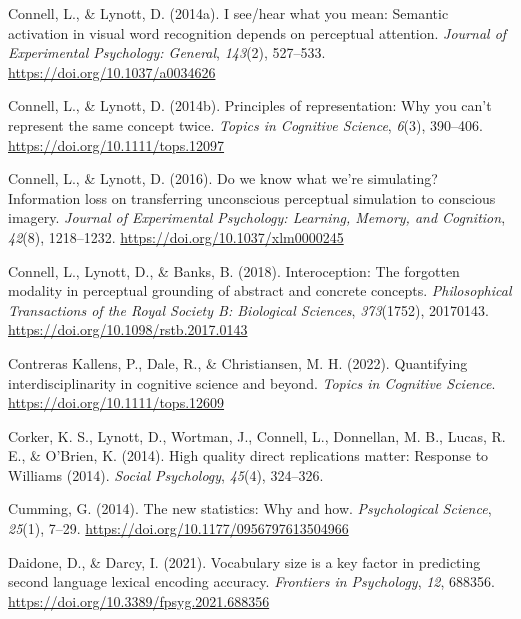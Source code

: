 \documentclass[
  12pt,
  man,floatsintext]{apa7}
\newlength{\cslhangindent}
\newlength{\cslentryspacingunit} %
\newenvironment{CSLReferences}[2] %
 {%
  \setlength{\parindent}{0pt}
  \ifodd #1
  \let\oldpar\par
  \def\par{\hangindent=\cslhangindent\oldpar}
  \fi
  \setlength{\parskip}{#2\cslentryspacingunit}
 }%
 {}
\begin{document}
\begin{CSLReferences}{1}{0}
\leavevmode{}%
Connell, L., \& Lynott, D. (2014a). I see/hear what you mean: {Semantic} activation in visual word recognition depends on perceptual attention. \emph{Journal of Experimental Psychology: General}, \emph{143}(2), 527--533. \url{https://doi.org/10.1037/a0034626}

\leavevmode{}%
Connell, L., \& Lynott, D. (2014b). Principles of representation: Why you can't represent the same concept twice. \emph{Topics in Cognitive Science}, \emph{6}(3), 390--406. \url{https://doi.org/10.1111/tops.12097}

\leavevmode{}%
Connell, L., \& Lynott, D. (2016). Do we know what we're simulating? {Information} loss on transferring unconscious perceptual simulation to conscious imagery. \emph{Journal of Experimental Psychology: Learning, Memory, and Cognition}, \emph{42}(8), 1218--1232. \url{https://doi.org/10.1037/xlm0000245}

\leavevmode{}%
Connell, L., Lynott, D., \& Banks, B. (2018). Interoception: The forgotten modality in perceptual grounding of abstract and concrete concepts. \emph{Philosophical Transactions of the Royal Society B: Biological Sciences}, \emph{373}(1752), 20170143. \url{https://doi.org/10.1098/rstb.2017.0143}

\leavevmode{}%
Contreras Kallens, P., Dale, R., \& Christiansen, M. H. (2022). Quantifying interdisciplinarity in cognitive science and beyond. \emph{Topics in Cognitive Science}. \url{https://doi.org/10.1111/tops.12609}

\leavevmode{}%
Corker, K. S., Lynott, D., Wortman, J., Connell, L., Donnellan, M. B., Lucas, R. E., \& O'Brien, K. (2014). High quality direct replications matter: {Response} to {Williams} (2014). \emph{Social Psychology}, \emph{45}(4), 324--326.

\leavevmode{}%
Cumming, G. (2014). The new statistics: {Why} and how. \emph{Psychological Science}, \emph{25}(1), 7--29. \url{https://doi.org/10.1177/0956797613504966}

\leavevmode{}%
Daidone, D., \& Darcy, I. (2021). Vocabulary size is a key factor in predicting second language lexical encoding accuracy. \emph{Frontiers in Psychology}, \emph{12}, 688356. \url{https://doi.org/10.3389/fpsyg.2021.688356}


\end{CSLReferences}
\end{document}
